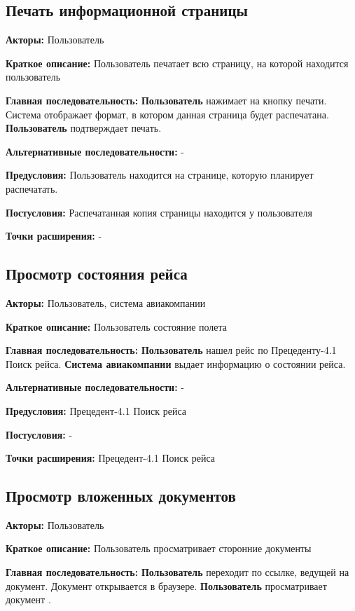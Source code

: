 \subsection{Печать информационной страницы}

\textbf{Акторы:} Пользователь

\textbf{Краткое описание:} Пользователь печатает всю страницу, на которой находится пользователь

\textbf{Главная последовательность:} \textbf{Пользователь} нажимает на кнопку печати. Система отображает формат, в котором данная страница
будет распечатана. \textbf{Пользователь} подтверждает печать.

\textbf{Альтернативные последовательности:} -

\textbf{Предусловия:} Пользователь находится на странице, которую планирует распечатать.

\textbf{Постусловия:} Распечатанная копия страницы находится у пользователя

\textbf{Точки расширения:} -




\subsection{Просмотр состояния рейса}

\textbf{Акторы:} Пользователь, система авиакомпании

\textbf{Краткое описание:} Пользователь состояние полета

\textbf{Главная последовательность:} \textbf{Пользователь} нашел рейс по Прецеденту-4.1 Поиск рейса. \textbf{Система авиакомпании}
выдает информацию о состоянии рейса.

\textbf{Альтернативные последовательности:} -

\textbf{Предусловия:} Прецедент-4.1 Поиск рейса

\textbf{Постусловия:} -

\textbf{Точки расширения:} Прецедент-4.1 Поиск рейса




\subsection{Просмотр вложенных документов}

\textbf{Акторы:} Пользователь

\textbf{Краткое описание:} Пользователь просматривает сторонние документы

\textbf{Главная последовательность:} \textbf{Пользователь} переходит по ссылке, ведущей на документ. Документ открывается в браузере.
\textbf{Пользователь} просматривает документ .

